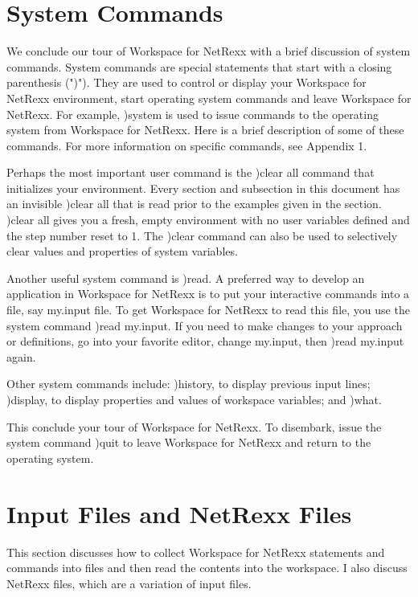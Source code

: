  \section{System Commands}

We conclude our tour of Workspace for NetRexx with a brief discussion of system commands. System commands are special statements that start with a closing parenthesis (")"). They are used to control or display your Workspace for NetRexx environment, start operating system commands and leave Workspace for NetRexx. For example, )system is used to issue commands to the operating system from Workspace for NetRexx. Here is a brief description of some of these commands. For more information on specific commands, see Appendix 1.

Perhaps the most important user command is the )clear all command that initializes your environment. Every section and subsection in this document has an invisible )clear all that is read prior to the examples given in the section. )clear all gives you a fresh, empty environment with no user variables defined and the step number reset to 1. The )clear command can also be used to selectively clear values and properties of system variables.

Another useful system command is )read. A preferred way to develop an application in Workspace for NetRexx is to put your interactive commands into a file, say my.input file. To get Workspace for NetRexx to read this file, you use the system command )read my.input. If you need to make changes to your approach or definitions, go into your favorite editor, change my.input, then )read my.input again.

Other system commands include: )history, to display previous input lines; )display, to display properties and values of workspace variables; and )what.

This conclude your tour of Workspace for NetRexx. To disembark, issue the system command )quit to leave Workspace for NetRexx and return to the operating system.

\section{Input Files and NetRexx Files}

This section discusses how to collect Workspace for NetRexx statements and commands into files and then read the contents into the workspace. I also discuss NetRexx files, which are a variation of input files.


